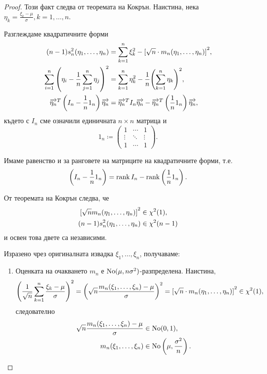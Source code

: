 \documentclass[numbers=endperiod, DIV=15, bibliography=totocnumbered]{scrartcl}
\begin{document}
\begin{proof}
  Този факт следва от теоремата на Кокрън. Наистина, нека $\eta_k = \frac {\xi_k - \mu} \sigma, k = 1, \ldots, n$.

  Разглеждаме квадратичните форми
  \begin{align*}
    (n-1) s_n^2(\eta_1, \ldots, \eta_n)
    &=
    \sum_{k=1}^n \xi_k^2 - {[\sqrt n \cdot m_n(\eta_1, \ldots, \eta_n)]}^2,
    \\
    \sum_{i=1}^n {\left(\eta_i - \frac 1 n \sum_{j=1}^n \eta_j \right)}^2
    &=
    \sum_{k=1}^n \eta_k^2 - \frac 1 n {\left(\sum_{k=1}^n \eta_k \right)}^2,
    \\
    \overrightarrow{\eta_n}^T \left(I_n - \frac 1 n 1_n \right) \overrightarrow{\eta_n}
    &=
    \overrightarrow{\eta_n}^T I_n \overrightarrow{\eta_n} - \overrightarrow{\eta_n}^T \left(\frac 1 n 1_n \right) \overrightarrow{\eta_n},
  \end{align*}
  където с $I_n$ сме означили единичната $n \times n$ матрица и
  \begin{displaymath}
    1_n
    \coloneqq
    \begin{pmatrix}
      1 & \cdots & 1 \\
      \vdots & \ddots & \vdots \\
      1 & \cdots & 1
    \end{pmatrix}.
  \end{displaymath}

  Имаме равенство и за ранговете на матриците на квадратичните форми, т.е.
  \begin{displaymath}
    \left(I_n - \frac 1 n 1_n \right) = \operatorname{rank} I_n - \operatorname{rank} \left( \frac 1 n 1_n \right).
  \end{displaymath}

  От теоремата на Кокрън следва, че
  \begin{align*}
    {[\sqrt n m_n(\eta_1, \ldots, \eta_n)]}^2 &\in \operatorname{\chi^2}(1),
    \\
    (n-1) s_n^2(\eta_1, \ldots, \eta_n) &\in \operatorname{\chi^2}(n - 1)
  \end{align*}
  и освен това двете са независими.

  Изразено чрез оригиналната извадка $\xi_1, \ldots, \xi_n$, получаваме:
  \begin{enumerate}
    \item Оценката на очакването $m_n$ е $\operatorname{No}(\mu, n \sigma^2)$-разпределена. Наистина,
    \begin{align*}
      {\left(\frac 1 {\sqrt n} \sum_{k=1}^n \frac {\xi_k - \mu} \sigma \right)}^2
      =
      {\left( \sqrt n \frac {m_n(\xi_1, \ldots, \xi_n) - \mu} \sigma \right)}^2
      =
      {[\sqrt n \cdot m_n(\eta_1, \ldots, \eta_n)]}^2
      \in
      \operatorname{\chi^2}(1),
    \end{align*}
    следователно
    \begin{align*}
      \sqrt n \frac {m_n(\xi_1, \ldots, \xi_n) - \mu} \sigma &\in \operatorname{No}(0, 1),
      \\
      m_n(\xi_1, \ldots, \xi_n) &\in \operatorname{No} \left(\mu, \frac {\sigma^2} n \right).
    \end{align*}


\end{enumerate}
\end{proof}
\end{document}
